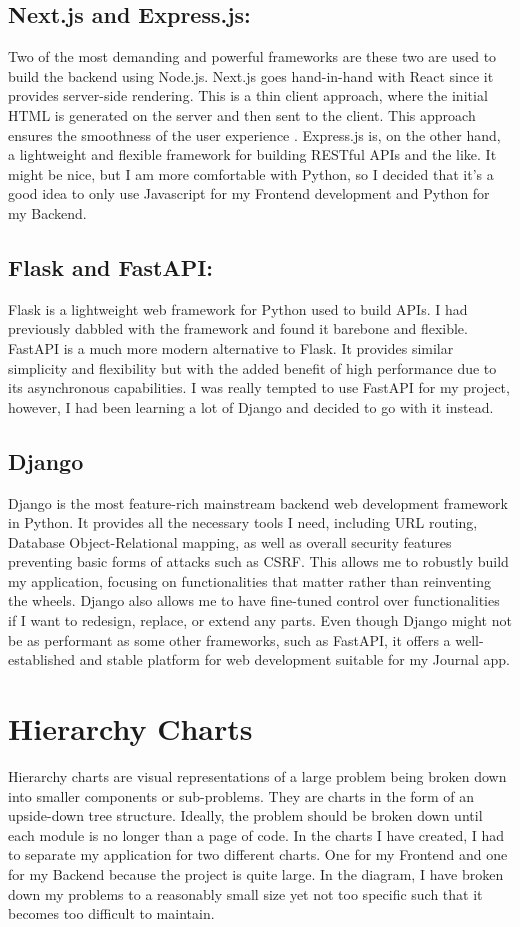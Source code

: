 \subsection{Next.js and Express.js:}
Two of the most demanding and powerful frameworks are these two are used to build the backend using Node.js. Next.js goes hand-in-hand with React since it provides server-side rendering. This is a thin client approach, where the initial HTML is generated on the server and then sent to the client. This approach ensures the smoothness of the user experience \cite{gillis_2020_fat}. Express.js is, on the other hand, a lightweight and flexible framework for building RESTful APIs and the like. It might be nice, but I am more comfortable with Python, so I decided that it's a good idea to only use Javascript for my Frontend development and Python for my Backend.

\subsection{Flask and FastAPI:}
Flask is a lightweight web framework for Python used to build APIs. I had previously dabbled with the framework and found it barebone and flexible. FastAPI is a much more modern alternative to Flask. It provides similar simplicity and flexibility but with the added benefit of high performance due to its asynchronous capabilities. I was really tempted to use FastAPI for my project, however, I had been learning a lot of Django and decided to go with it instead.

\subsection{Django}
Django is the most feature-rich mainstream backend web development framework in Python. It provides all the necessary tools I need, including URL routing, Database Object-Relational mapping, as well as overall security features preventing basic forms of attacks such as CSRF. This allows me to robustly build my application, focusing on functionalities that matter rather than reinventing the wheels. Django also allows me to have fine-tuned control over functionalities if I want to redesign, replace, or extend any parts. Even though Django might not be as performant as some other frameworks, such as FastAPI, it offers a well-established and stable platform for web development suitable for my Journal app.

\section{Hierarchy Charts}
Hierarchy charts are visual representations of a large problem being broken down into smaller components or sub-problems. They are charts in the form of an upside-down tree structure. Ideally, the problem should be broken down until each module is no longer than a page of code. In the charts I have created, I had to separate my application for two different charts. One for my Frontend and one for my Backend because the project is quite large. In the diagram, I have broken down my problems to a reasonably small size yet not too specific such that it becomes too difficult to maintain.

